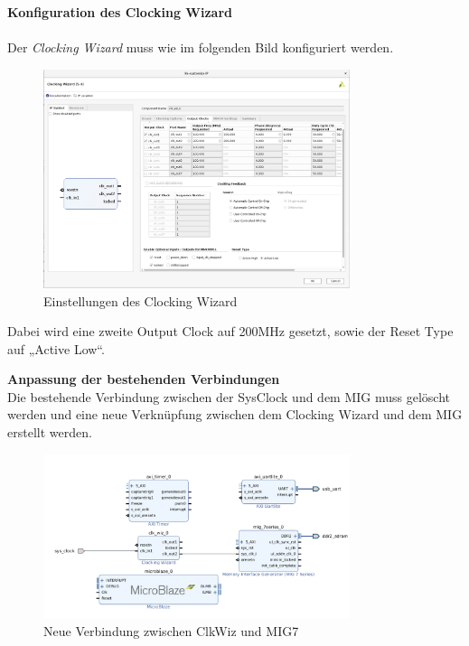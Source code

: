 \newpage
\textbf{Konfiguration des Clocking Wizard}\\\\
Der \emph{Clocking Wizard} muss wie im folgenden Bild konfiguriert werden.\\

\vspace{10mm}

\begin{figure}[H]
\centering
\includegraphics[width=0.8\textwidth]{Hauptteil/Schritt5.png}
\caption{Einstellungen des Clocking Wizard}\label{fig:mbschritt5}
\end{figure}

\vspace{10mm}

Dabei wird eine zweite Output Clock auf 200MHz gesetzt, sowie der Reset Type auf „Active Low“.\\

\newpage

\textbf{Anpassung der bestehenden Verbindungen}\\

Die bestehende Verbindung zwischen der SysClock und dem MIG muss gelöscht werden und eine neue Verknüpfung zwischen dem Clocking Wizard und dem MIG erstellt werden.\\

\begin{figure}[H]
\centering
\includegraphics[width=0.8\textwidth]{Hauptteil/schritt6.png}
\caption{Neue Verbindung zwischen ClkWiz und MIG7}\label{fig:mbschritt6}
\end{figure}


